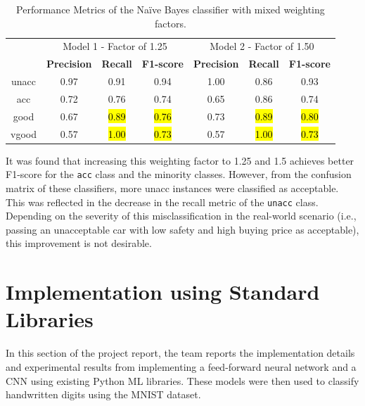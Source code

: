 \documentclass[a4paper]{article}
\begin{document}
\begin{table}[h!]
  \centering
  \caption{Performance Metrics of the Naïve Bayes classifier with mixed weighting factors.}
  \label{tab:nb_performance_1.25_5_5}
  \begin{tabular}{||c | c c c | c c c||}

  \hline
  \centering
  \multirow{2}{*}{Class}    & \multicolumn{3}{c|}{Model 1 - Factor of 1.25}                     & \multicolumn{3}{c||}{Model 2 - Factor of 1.50} \\\cline{2-7} 
                            & \textbf{Precision}  & \textbf{Recall}   & \textbf{F1-score}       & \textbf{Precision}  & \textbf{Recall}   & \textbf{F1-score}\\
  \hline \hline
  unacc                     & 0.97                & 0.91              & 0.94                    & 1.00                & 0.86              & 0.93\\ \hline
  acc                       & 0.72                & 0.76              & 0.74                    & 0.65                & 0.86              & 0.74\\ \hline
  good                      & 0.67                & \hl{0.89}         & \hl{0.76}               & 0.73                & \hl{0.89}         & \hl{0.80}\\ \hline
  vgood                     & 0.57                & \hl{1.00}         & \hl{0.73}               & 0.57                & \hl{1.00}         & \hl{0.73}\\ \hline
  \end{tabular}
\end{table}


It was found that increasing this weighting factor to 1.25 and 1.5 achieves better F1-score for the \lstinline{acc} class and the minority classes. However, from the confusion matrix of these classifiers, more unacc instances were classified as acceptable. This was reflected in the decrease in the recall metric of the \lstinline{unacc} class. Depending on the severity of this misclassification in the real-world scenario (i.e., passing an unacceptable car with low safety and high buying price as acceptable), this improvement is not desirable.

\section{Implementation using Standard Libraries}
In this section of the project report, the team reports the implementation details and experimental results from implementing a feed-forward neural network and a CNN using existing Python ML libraries. These models were then used to classify handwritten digits using the MNIST dataset.
\end{document}
